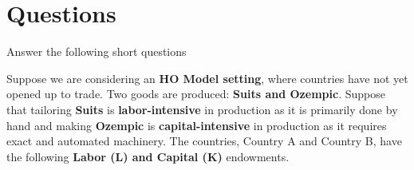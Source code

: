 \documentclass[12pt]{exam}
\begin{document}
\section*{Questions}
\begin{questions}

\question
Answer the following short questions


\newpage 

\question
Suppose we are considering an \textbf{HO Model setting}, where countries have not yet opened up to trade.
Two goods are produced: \textbf{Suits and Ozempic}. 
Suppose that tailoring \textbf{Suits} is \textbf{labor-intensive} in production as it is primarily done by hand and making \textbf{Ozempic} is \textbf{capital-intensive} in production as it requires exact and automated machinery. 
The countries, Country A and Country B, have the following \textbf{Labor (L) and Capital (K)} endowments.



\end{questions}
\end{document}
